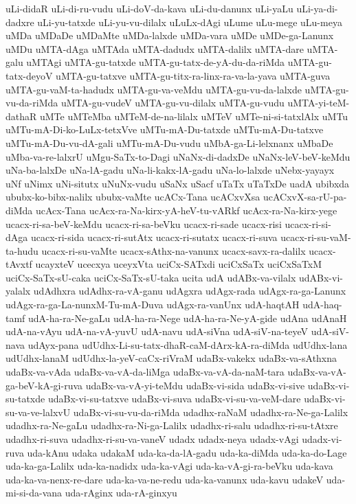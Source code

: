 {uLi-didaR
uLi-di-ru-vudu
uLi-doV-da-kava
uLi-du-danunx
uLi-yaLu
uLi-ya-di-dadxre
uLi-yu-tatxde
uLi-yu-vu-dilalx
uLuLx-dAgi
uLume
uLu-mege
uLu-meya
uMDa
uMDaDe
uMDaMte
uMDa-lalxde
uMDa-vara
uMDe
uMDe-ga-Lanunx
uMDu
uMTA-dAga
uMTAda
uMTA-dadudx
uMTA-dalilx
uMTA-dare
uMTA-galu
uMTAgi
uMTA-gu-tatxde
uMTA-gu-tatx-de-yA-du-da-riMda
uMTA-gu-tatx-deyoV
uMTA-gu-tatxve
uMTA-gu-titx-ra-linx-ra-va-la-yava
uMTA-guva
uMTA-gu-vaM-ta-hadudx
uMTA-gu-va-veMdu
uMTA-gu-vu-da-lalxde
uMTA-gu-vu-da-riMda
uMTA-gu-vudeV
uMTA-gu-vu-dilalx
uMTA-gu-vudu
uMTA-yi-teM-dathaR
uMTe
uMTeMba
uMTeM-de-na-lilalx
uMTeV
uMTe-ni-si-tatxlAlx
uMTu
uMTu-mA-Di-ko-LuLx-tetxVve
uMTu-mA-Du-tatxde
uMTu-mA-Du-tatxve
uMTu-mA-Du-vu-dA-gali
uMTu-mA-Du-vudu
uMbA-ga-Li-lelxnanx
uMbaDe
uMba-va-re-lalxrU
uMgu-SaTx-to-Dagi
uNaNx-di-dadxDe
uNaNx-leV-beV-keMdu
uNa-ba-lalxDe
uNa-lA-gadu
uNa-li-kakx-lA-gadu
uNa-lo-lalxde
uNebx-yayayx
uNf
uNimx
uNi-situtx
uNuNx-vudu
uSaNx
uSacf
uTaTx
uTaTxDe
uadA
ubibxda
ububx-ko-bibx-nalilx
ububx-vaMte
ucACx-Tana
ucACxvXsa
ucACxvX-sa-rU-pa-diMda
ucAcx-Tana
ucAcx-ra-Na-kirx-yA-heV-tu-vARkf
ucAcx-ra-Na-kirx-yege
ucacx-ri-sa-beV-keMdu
ucacx-ri-sa-beVku
ucacx-ri-sade
ucacx-risi
ucacx-ri-si-dAga
ucacx-ri-sida
ucacx-ri-sutAtx
ucacx-ri-sutatx
ucacx-ri-suva
ucacx-ri-su-vaM-ta-hudu
ucacx-ri-su-vaMte
ucacx-sAthx-na-vanunx
ucacx-savx-ra-dalilx
ucacx-tAvxtf
ucayxteV
ucecxya
uceyxVta
uciCx-SATxdi
uciCxSaTx
uciCxSaTxM
uciCx-SaTx-sU-caka
uciCx-SaTx-sU-taka
ucita
udA
udABx-va-vilalx
udABx-vi-yalalx
udAdhxra
udAdhx-ra-vA-ganu
udAgxra
udAgx-rada
udAgx-ra-ga-Lanunx
udAgx-ra-ga-La-nunxM-Tu-mA-Duva
udAgx-ra-vanUnx
udA-haqtAH
udA-haq-tamf
udA-ha-ra-Ne-gaLu
udA-ha-ra-Nege
udA-ha-ra-Ne-yA-gide
udAna
udAnaH
udA-na-vAyu
udA-na-vA-yuvU
udA-navu
udA-siVna
udA-siV-na-teyeV
udA-siV-nava
udAyx-pana
udUdhx-Li-su-tatx-dhaR-caM-dArx-kA-ra-diMda
udUdhx-lana
udUdhx-lanaM
udUdhx-la-yeV-caCx-riVraM
udaBx-vakekx
udaBx-va-sAthxna
udaBx-va-vAda
udaBx-va-vA-da-liMga
udaBx-va-vA-da-naM-tara
udaBx-va-vA-ga-beV-kA-gi-ruva
udaBx-va-vA-yi-teMdu
udaBx-vi-sida
udaBx-vi-sive
udaBx-vi-su-tatxde
udaBx-vi-su-tatxve
udaBx-vi-suva
udaBx-vi-su-va-veM-dare
udaBx-vi-su-va-ve-lalxvU
udaBx-vi-su-vu-da-riMda
udadhx-raNaM
udadhx-ra-Ne-ga-Lalilx
udadhx-ra-Ne-gaLu
udadhx-ra-Ni-ga-Lalilx
udadhx-ri-salu
udadhx-ri-su-tAtxre
udadhx-ri-suva
udadhx-ri-su-va-vaneV
udadx
udadx-neya
udadx-vAgi
udadx-vi-ruva
uda-kAnu
udaka
udakaM
uda-ka-da-lA-gadu
uda-ka-diMda
uda-ka-do-Lage
uda-ka-ga-Lalilx
uda-ka-nadidx
uda-ka-vAgi
uda-ka-vA-gi-ra-beVku
uda-kava
uda-ka-va-nenx-re-dare
uda-ka-va-ne-redu
uda-ka-vanunx
uda-kavu
udakeV
uda-mi-si-da-vana
uda-rAginx
uda-rA-ginxyu
}
